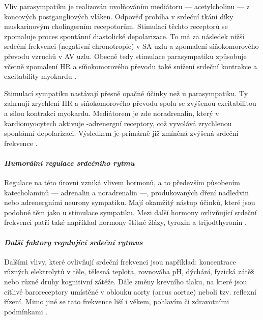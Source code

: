 Vliv parasympatiku je realizován uvolňováním mediátoru --- acetylcholinu --- z
koncových postgangliových vláken. Odpověď probíha v srdeční tkání díky
muskarinovým cholingerním recepotorům. Stimulací těchto receptorů se zpomaluje
proces spontánní diastolické depolarizace. To má za následek nižší srdeční
frekvenci (negativní chronotropie) v SA uzlu a zpomalení síňokomorového převodu
vzruchů v AV uzlu. Obecně tedy stimulace parasympatiku způsobuje včetně
zpomalení HR a síňokomorového převodu také snížení srdeční kontrakce a
excitability myokardu \cite{Kittnar2020}.

Stimulací sympatiku nastávají přesně opačné účinky než u parasympatiku. Ty
zahrnují zrychlení HR a síňokomorového převodu spolu se zvýšenou excitabilitou a
silou kontrakcí myokardu. Mediátorem je zde noradrenalin, který v
kardiomyocytech aktivuje \textbeta-adrenergní receptory, což vyvolává zrychlenou
spontánní depolarizaci. Výsledkem je primárně již zmíněná zvýšená srdeční
frekvence \cite{Kittnar2020}.

\paragraph*{\textit{Humorální regulace srdečního rytmu}\\} Regulace na této
úrovni vzniká vlivem hormonů, a to především působením katecholaminů ---
adrenalin a noradrenalin ---, produkovaných dření nadledvin nebo adrenergními
neurony sympatiku. Mají okamžitý nástup účinků, které jsou podobné těm jako u
stimulace sympatiku. Mezi další hormony ovlivňující srdeční frekvenci patří také
například hormony štítné žlázy, tyroxin a trijodthyronin
\cite{Kittnar2020,Orel2019}.

\paragraph*{\textit{Další faktory regulující srdeční rytmus}\\} Dalšími vlivy,
které ovlivňují srdeční frekvenci jsou například: koncentrace různých
elektrolytů v těle, tělesná teplota, rovnováha pH, dýchání, fyzická zátěž nebo
různé druhy kognitivní zátěže. Dále změny krevního tlaku, na které jsou citlivé
baroreceptory umístěné v oblouku aorty (arcus aortae) neboli tzv. reflexní
řízení. Mimo jiné se tato frekvence liší i věkem, pohlavím či zdravotními
podmínkami \cite{Kittnar2020}.

